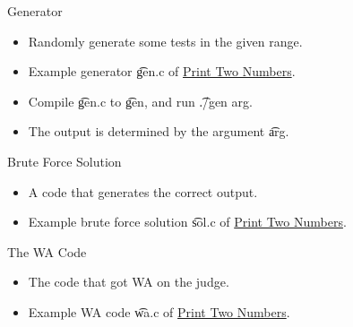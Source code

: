 \begin{frame}{Generator}
\begin{itemize}
\item Randomly generate some tests in the given range.
\item Example generator \t{gen.c} of \href{https://judgegirl.csie.org/problem/0/3}{Print Two Numbers}.

\item Compile \t{gen.c} to \t{gen}, and run \t{./gen arg}.
\item The output is determined by the argument \t{arg}.
\end{itemize}
\end{frame}

\begin{frame}{Brute Force Solution}
\begin{itemize}
\item A code that generates the correct output.
\item Example brute force solution \t{sol.c} of \href{https://judgegirl.csie.org/problem/0/3}{Print Two Numbers}.

\end{itemize}
\end{frame}

\begin{frame}{The WA Code}
\begin{itemize}
\item The code that got WA on the judge.
\item Example WA code \t{wa.c} of \href{https://judgegirl.csie.org/problem/0/3}{Print Two Numbers}.

\end{itemize}
\end{frame}

